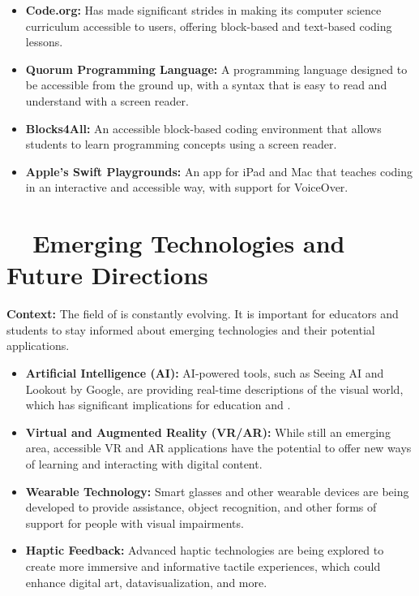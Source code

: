 \begin{itemize}
	\item \textbf{Code.org:} Has made significant strides in making its computer science curriculum accessible to  users, offering block-based and text-based coding lessons.
	\item \textbf{Quorum Programming Language:} A programming language designed to be accessible from the ground up, with a syntax that is easy to read and understand with a screen reader.
	\item \textbf{Blocks4All:} An accessible block-based coding environment that allows students to learn programming concepts using a screen reader.
	\item \textbf{Apple's Swift Playgrounds:} An app for iPad and Mac that teaches coding in an interactive and accessible way, with support for VoiceOver.
\end{itemize}

\section{~~Emerging Technologies and Future Directions}\label{app4:emerging-tech}

\noindent
\textbf{Context:} The field of  is constantly evolving. It is important for educators and students to stay informed about emerging technologies and their potential applications.

\begin{itemize}
	\item \textbf{Artificial Intelligence (AI):} AI-powered tools, such as Seeing AI and Lookout by Google, are providing real-time descriptions of the visual world, which has significant implications for education and .
	\item \textbf{Virtual and Augmented Reality (VR/AR):} While still an emerging area, accessible VR and AR applications have the potential to offer new ways of learning and interacting with digital content.
	\item \textbf{Wearable Technology:} Smart glasses and other wearable devices are being developed to provide  assistance, object recognition, and other forms of support for people with visual impairments.
	\item \textbf{Haptic Feedback:} Advanced haptic technologies are being explored to create more immersive and informative tactile experiences, which could enhance digital art, \gls{datavisualization}, and more.
\end{itemize}

